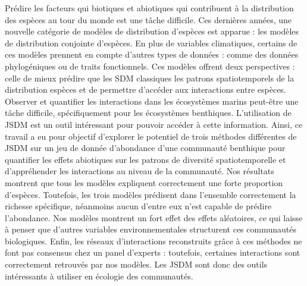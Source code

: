 \documentclass[12pt,]{article}
\begin{document}
Prédire les facteurs qui biotiques et abiotiques qui contribuent à la
distribution des espèces au tour du monde est une tâche difficile. Ces
dernières années, une nouvelle catégorie de modèles de distribution
d'espèces est apparue : les modèles de distribution conjointe d'espèces.
En plus de variables climatiques, certains de ces modèles prennent en
compte d'autres types de données : comme des données phylogéniques ou de
traits fonctionnels. Ces modèles offrent deux perspectives : celle de
mieux prédire que les SDM classiques les patrons spatiotemporels de la
distribution espèces et de permettre d'accéder aux interactions entre
espèces. Observer et quantifier les interactions dans les écosystèmes
marins peut-être une tâche difficile, spécifiquement pour les
écosystèmes benthiques. L'utilisation de JSDM est un outil intéressant
pour pouvoir accéder à cette information. Ainsi, ce travail a eu pour
objectif d'explorer le potentiel de trois méthodes différentes de JSDM
sur un jeu de donnée d'abondance d'une communauté benthique pour
quantifier les effets abiotiques sur les patrons de diversité
spatiotemporelle et d'appréhender les interactions au niveau de la
communauté. Nos résultats montrent que tous les modèles expliquent
correctement une forte proportion d'espèces. Toutefois, les trois
modèles prédisent dans l'ensemble correctement la richesse spécifique,
néanmoins aucun d'entre eux n'est capable de prédire l'abondance. Nos
modèles montrent un fort effet des effets aléatoires, ce qui laisse à
penser que d'autres variables environnementales structurent ces
communautés biologiques. Enfin, les réseaux d'interactions reconstruits
grâce à ces méthodes ne font pas consensus chez un panel d'experts :
toutefois, certaines interactions sont correctement retrouvés par nos
modèles. Les JSDM sont donc des outils intéressants à utiliser en
écologie des communautés.
\end{document}
